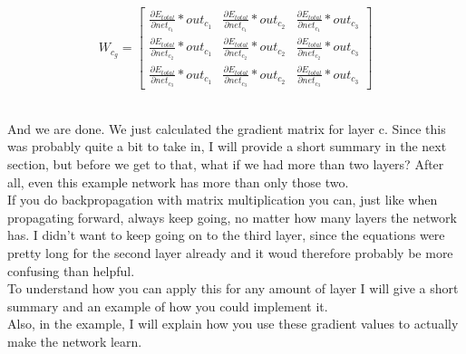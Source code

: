 \documentclass[11pt, halfparskip]{article}
\begin{document}
    \[
    	W_{c_g} = 
    	\begin{bmatrix}
    		\frac{\partial E_{total}}{\partial net_{c_1}} * out_{c_1} & \frac{\partial E_{total}}{\partial net_{c_1}} * out_{c_2}
    		& \frac{\partial E_{total}}{\partial net_{c_1}} * out_{c_3}\\
    		\frac{\partial E_{total}}{\partial net_{c_2}} * out_{c_1} & \frac{\partial E_{total}}{\partial net_{c_2}} * out_{c_2}
    		& \frac{\partial E_{total}}{\partial net_{c_2}} * out_{c_3}\\
    		\frac{\partial E_{total}}{\partial net_{c_3}} * out_{c_1} & \frac{\partial E_{total}}{\partial net_{c_3}} * out_{c_2}
    		& \frac{\partial E_{total}}{\partial net_{c_3}} * out_{c_3}
    	\end{bmatrix}
    \]
    
    \noindent \\
    And we are done. We just calculated the gradient matrix for layer c. Since this was probably quite a bit to take in, I will provide a short summary in the next section, but before we
    get to that, what if we had more than two layers? After all, even this example network has more than only those two.\\
    If you do backpropagation with matrix multiplication you can, just like when propagating forward, always keep going, no matter how many layers the network has. I didn't want to
    keep going on to the third layer, since the equations were pretty long for the second layer already and it woud therefore probably be more confusing than helpful.\\
    To understand how you can apply this for any amount of layer I will give a short summary and an example of how you could implement it.\\
    Also, in the example, I will explain how you use these gradient values to actually make the network learn.
    
    \newpage
\end{document}
